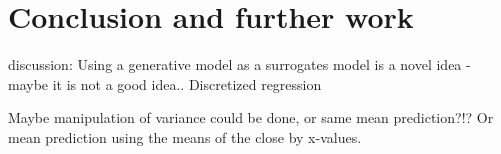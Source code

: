 \chapter{Conclusion and further work}

discussion: Using a generative model as a surrogates model is a novel idea - maybe it is not a good
idea.. 
Discretized regression

Maybe manipulation of variance could be done, or same mean prediction?!? Or 
mean prediction using the means of the close by x-values. 